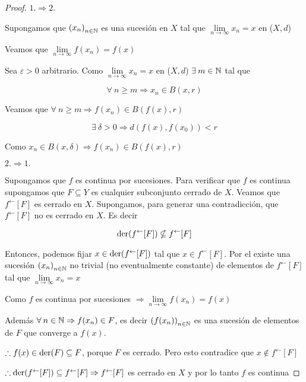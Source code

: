 \begin{proof}
    $1. \Rightarrow 2.$

    Supongamos que ${(x_n)}_{n \in \mathbb{N}}$ es una sucesión en $X$ tal que $\lim\limits_{n \to \infty} x_n = x$ en ($X,d$) 

    Veamos que $\lim\limits_{n \to \infty} f(x_n) = f(x)$

    Sea $\varepsilon > 0$ arbitrario. Como  $\lim\limits_{n \to \infty} x_n = x$ en ($X,d$) $\exists \: m \in \mathbb{N}$ tal que 

    $$\forall \: n \geqslant m \Rightarrow x_n \in B(x,r)$$

    Veamos que $\forall \: n \geqslant m \Rightarrow f(x_n) \in B(f(x),r)$

    $$\exists \: \delta > 0 \Rightarrow d(f(x),f(x_0)) < r$$

    Como $x_n \in B(x,\delta) \Rightarrow f(x_n) \in B(f(x),r)$

    $2. \Rightarrow 1.$

    Supongamos que $f$ es continua por sucesiones. Para verificar que $f$ es continua supongamos que $F \subseteq Y$ es cualquier subconjunto cerrado de $X$. Veamos que $f^\leftarrow[F]$ es cerrado en $X$. Supongamos, para generar una contradicción, que $f^\leftarrow[F]$ no es cerrado en $X$. Es decir

    $$\mathrm{der}(f^\leftarrow[F]) \nsubseteq f^\leftarrow[F]$$

    Entonces, podemos fijar $x \in \mathrm{der}(f^\leftarrow[F])$ tal que $x \in f^\leftarrow[F]$. Por el  existe una sucesión ${(x_n)}_{n \in \mathbb{N}}$ no trivial (no eventualmente constante) de elementos de $f^\leftarrow[F]$ tal que $\lim\limits_{n \to \infty} x_n = x$

    Como $f$ es continua por sucesiones $\Rightarrow \lim\limits_{n \to \infty} f(x_n) = f(x)$

    Además $\forall \: n \in \mathbb{N} \Rightarrow f(x_n) \in F$, es decir ${(f(x_n))}_{n \in \mathbb{N}}$ es una sucesión de elementos de $F$ que converge a $f(x)$. 

    $\therefore f(x) \in \mathrm{der}(F) \subseteq F$, porque $F$ es cerrado. Pero esto contradice que $x \notin f^\leftarrow[F]$

    $\therefore \mathrm{der}(f^\leftarrow[F]) \subseteq f^\leftarrow[F] \Rightarrow f^\leftarrow[F] $ es cerrado en $X$ y por lo tanto $f$ es continua
\end{proof}